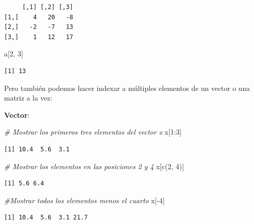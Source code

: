 \documentclass[
]{book}
\newenvironment{Shaded}{\begin{snugshade}}{\end{snugshade}}
\newcommand{\CommentTok}[1]{\textcolor[rgb]{0.56,0.35,0.01}{\textit{#1}}}
\newcommand{\DecValTok}[1]{\textcolor[rgb]{0.00,0.00,0.81}{#1}}
\newcommand{\FunctionTok}[1]{\textcolor[rgb]{0.00,0.00,0.00}{#1}}
\newcommand{\NormalTok}[1]{#1}
\newcommand{\SpecialCharTok}[1]{\textcolor[rgb]{0.00,0.00,0.00}{#1}}
\begin{document}
\begin{verbatim}
     [,1] [,2] [,3]
[1,]    4   20   -8
[2,]   -2   -7   13
[3,]    1   12   17
\end{verbatim}

\begin{Shaded}
\begin{Highlighting}[]
\NormalTok{a[}\DecValTok{2}\NormalTok{, }\DecValTok{3}\NormalTok{]}
\end{Highlighting}
\end{Shaded}

\begin{verbatim}
[1] 13
\end{verbatim}

Pero también podemos hacer indexar a múltiples elementos de un vector o una matriz a la vez:

\textbf{Vector}:

\begin{Shaded}
\begin{Highlighting}[]
\CommentTok{\# Mostrar los primeros tres elementos del vector x}
\NormalTok{x[}\DecValTok{1}\SpecialCharTok{:}\DecValTok{3}\NormalTok{]}
\end{Highlighting}
\end{Shaded}

\begin{verbatim}
[1] 10.4  5.6  3.1
\end{verbatim}

\begin{Shaded}
\begin{Highlighting}[]
\CommentTok{\# Mostrar los elementos en las posiciones 2 y 4}
\NormalTok{x[}\FunctionTok{c}\NormalTok{(}\DecValTok{2}\NormalTok{, }\DecValTok{4}\NormalTok{)]}
\end{Highlighting}
\end{Shaded}

\begin{verbatim}
[1] 5.6 6.4
\end{verbatim}

\begin{Shaded}
\begin{Highlighting}[]
\CommentTok{\#Mostrar todos los elementos menos el cuarto}
\NormalTok{x[}\SpecialCharTok{{-}}\DecValTok{4}\NormalTok{]}
\end{Highlighting}
\end{Shaded}

\begin{verbatim}
[1] 10.4  5.6  3.1 21.7
\end{verbatim}
\end{document}
